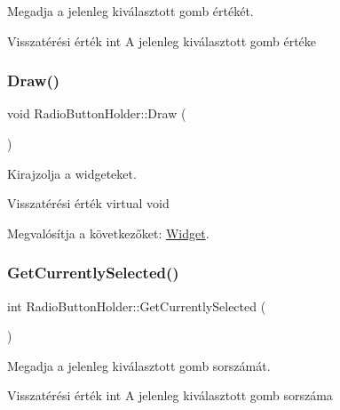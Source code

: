 Megadja a jelenleg kiválasztott gomb értékét. 

\begin{DoxyReturn}{Visszatérési érték}
int A jelenleg kiválasztott gomb értéke 
\end{DoxyReturn}
\mbox{\label{class_radio_button_holder_a70d6ba1724bdb68afe351d0474cbd767}} 
\subsubsection{\texorpdfstring{Draw()}{Draw()}}
{\footnotesize\ttfamily void Radio\+Button\+Holder\+::\+Draw (\begin{DoxyParamCaption}{ }\end{DoxyParamCaption})\hspace{0.3cm}{\ttfamily [virtual]}}



Kirajzolja a widgeteket. 

\begin{DoxyReturn}{Visszatérési érték}
virtual void 
\end{DoxyReturn}


Megvalósítja a következőket\+: \hyperlink{class_widget_ac4c2063cd671468ad05d84cfe963c032}{Widget}.

\mbox{\label{class_radio_button_holder_ad185ab84d978e645eac54f236069705b}} 
\subsubsection{\texorpdfstring{Get\+Currently\+Selected()}{GetCurrentlySelected()}}
{\footnotesize\ttfamily int Radio\+Button\+Holder\+::\+Get\+Currently\+Selected (\begin{DoxyParamCaption}{ }\end{DoxyParamCaption})}



Megadja a jelenleg kiválasztott gomb sorszámát. 

\begin{DoxyReturn}{Visszatérési érték}
int A jelenleg kiválasztott gomb sorszáma 
\end{DoxyReturn}
\mbox{\label{class_radio_button_holder_a7b4ed9e75eef252ad20c3cbcb8547981}} 
